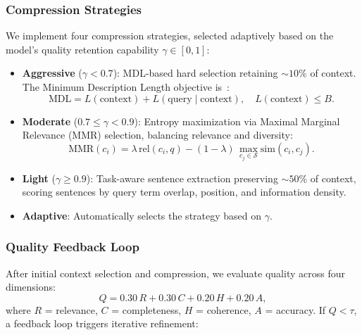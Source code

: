 \documentclass[11pt,letterpaper]{article}
\begin{document}
\subsubsection{Compression Strategies}

We implement four compression strategies, selected adaptively based on the
model's quality retention capability $\gamma \in [0,1]$:

\begin{itemize}[nosep]
  \item \textbf{Aggressive} ($\gamma < 0.7$):
    MDL-based hard selection retaining ${\sim}10\%$ of context.
    The Minimum Description Length objective
    is~\citep{grunwald2007mdl}:
    \begin{equation}
      \mathrm{MDL} = L(\text{context}) + L(\text{query} \mid \text{context}),
      \quad
      L(\text{context}) \leq B.
      \label{eq:mdl}
    \end{equation}

  \item \textbf{Moderate} ($0.7 \leq \gamma < 0.9$):
    Entropy maximization via Maximal Marginal Relevance (MMR) selection,
    balancing relevance and diversity:
    \begin{equation}
      \mathrm{MMR}(c_i) =
        \lambda\, \mathrm{rel}(c_i, q)
        - (1-\lambda)\,
          \max_{c_j \in \mathcal{S}}
            \mathrm{sim}(c_i, c_j).
      \label{eq:mmr}
    \end{equation}

  \item \textbf{Light} ($\gamma \geq 0.9$):
    Task-aware sentence extraction preserving ${\sim}50\%$ of context,
    scoring sentences by query term overlap, position, and information
    density.

  \item \textbf{Adaptive}: Automatically selects the strategy based on
    $\gamma$.
\end{itemize}

\subsubsection{Quality Feedback Loop}
\label{sec:feedback}

After initial context selection and compression, we evaluate quality across
four dimensions:
\begin{equation}
  Q = 0.30\,R + 0.30\,C + 0.20\,H + 0.20\,A,
  \label{eq:quality}
\end{equation}
where $R$ = relevance, $C$ = completeness, $H$ = coherence, $A$ = accuracy.
If $Q < \tau$, a feedback loop triggers iterative refinement:
\end{document}

